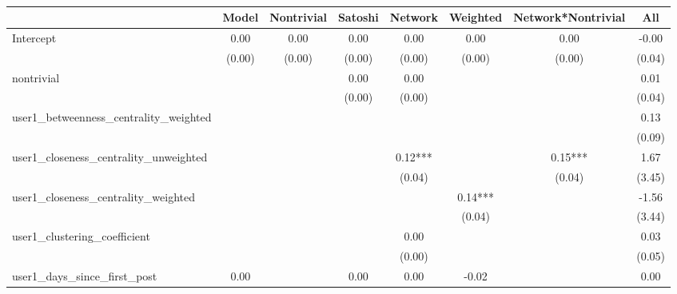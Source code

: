 \begin{table}
\centering
\caption{}
\begin{center}
\begin{tabular}{lccccccc}
\hline
                                      & Model    & Nontrivial & Satoshi & Network & Weighted & Network*Nontrivial &     All       \\
\hline
\hline

Intercept                             & 0.00     & 0.00       & 0.00    & 0.00    & 0.00     & 0.00               & -0.00         \\
                                      & (0.00)   & (0.00)     & (0.00)  & (0.00)  & (0.00)   & (0.00)             & (0.04)        \\
nontrivial                            &          &            & 0.00    & 0.00    &          &                    & 0.01          \\
                                      &          &            & (0.00)  & (0.00)  &          &                    & (0.04)        \\
user1_betweenness_centrality_weighted &          &            &         &         &          &                    & 0.13          \\
                                      &          &            &         &         &          &                    & (0.09)        \\
user1_closeness_centrality_unweighted &          &            &         & 0.12*** &          & 0.15***            & 1.67          \\
                                      &          &            &         & (0.04)  &          & (0.04)             & (3.45)        \\
user1_closeness_centrality_weighted   &          &            &         &         & 0.14***  &                    & -1.56         \\
                                      &          &            &         &         & (0.04)   &                    & (3.44)        \\
user1_clustering_coefficient          &          &            &         & 0.00    &          &                    & 0.03          \\
                                      &          &            &         & (0.00)  &          &                    & (0.05)        \\
user1_days_since_first_post           & 0.00     &            & 0.00    & 0.00    & -0.02    &                    & 0.00          \\

\end{tabular}
\end{center}
\end{table}
